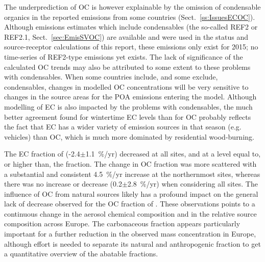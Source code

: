 The underprediction of OC is however explainable by the omission of condensable organics in the reported \pmfine emissions from some countries (Sect.~\ref{ss:IssuesECOC}). Although emissions estimates which include condensables (the so-called REF2 or REF2.1, Sect.~\ref{sec:EmisSVOC}) are available and were used in the status and source-receptor calculations of this report, these emissions only exist for 2015; no time-series of REF2-type emissions yet exists. The lack of significance of the calculated OC trends may also be attributed to some extent to these problems with condensables. When some countries include, and some exclude, condensables, changes in modelled OC concentrations will be very sensitive to changes in the source areas for the POA emissions entering the model.
Although modelling of EC is also impacted by the problems with condensables, the much better agreement found for wintertime EC levels than for OC probably reflects the fact that EC has a wider variety of emission sources in that season (e.g. vehicles) than OC, which is much more dominated by residential wood-burning.


The EC fraction of \pmfine (-2.4$\pm$1.1~\%/yr) decreased at all
sites, and at a level equal to, or higher than, the  fraction. The
change in OC fraction was more scattered with a substantial and
consistent 4.5~\%/yr increase at the northernmost sites, whereas
there was no increase or decrease (0.2$\pm$2.8~\%/yr) when considering
all sites. The influence of OC from natural sources likely has a profound
impact on the general lack of decrease observed for the OC fraction of
\pmfine. These observations points to a continuous change in the aerosol
chemical composition and in the relative source composition across
Europe. The carbonaceous fraction appears particularly important for a
further reduction in the observed \pmfine mass concentration in Europe,
although effort is needed to separate its natural and anthropogenic
fraction to get a quantitative overview of the abatable fractions.
\\
\bigskip


